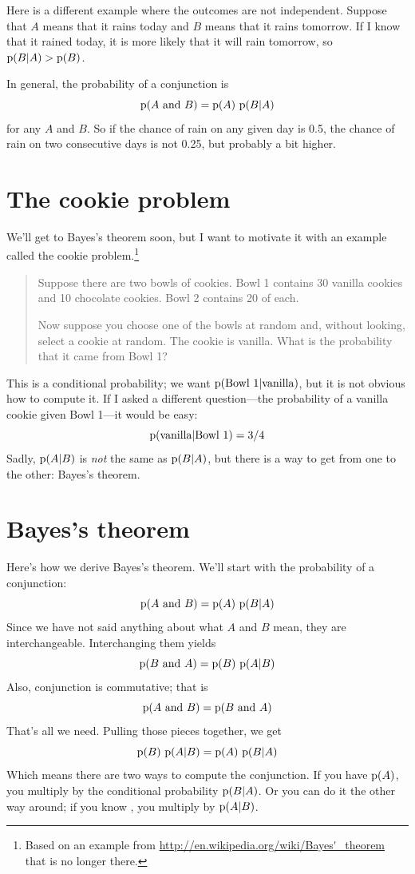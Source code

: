 \documentclass[12pt]{book}
\theoremstyle{exercise}
\begin{document}
Here is a different example where the outcomes are not independent.
Suppose that $A$ means that it rains today and $B$ means that it
rains tomorrow.  If I know that it rained today, it is more likely
that it will rain tomorrow, so $\mathrm{p}(B|A) > \mathrm{p}(B)$.

In general, the probability of a conjunction is
%
\[ \mathrm{p}(A ~\mathrm{and}~ B) = \mathrm{p}(A)~\mathrm{p}(B|A) \]
%
for any $A$ and $B$.  So if the chance of rain on any given day
is 0.5, the chance of rain on two consecutive days is not
0.25, but probably a bit higher.


\section{The cookie problem}
\label{cookie}


We'll get to Bayes's theorem soon, but I want to motivate it with an
example called the cookie problem.\footnote{Based on an example from
  \url{http://en.wikipedia.org/wiki/Bayes'_theorem} that is no longer
  there.}

\begin{quote}
Suppose there are two bowls of cookies.
Bowl 1 contains 30 vanilla cookies and 10 chocolate cookies.
Bowl 2 contains 20 of each.

Now suppose you choose one of the bowls at random and, without
looking, select a cookie at random.
The cookie is vanilla.
What is the probability that it came from Bowl 1?
\end{quote}

This is a conditional probability; we want $\mathrm{p}(\mbox{Bowl 1} |
  \mbox{vanilla})$, but it is not obvious how to compute it.  If I asked a
different question---the probability of a vanilla cookie given Bowl
1---it would be easy:
%
\[ \mathrm{p}(\mbox{vanilla} | \mbox{Bowl 1}) = 3/4 \]
%
Sadly, $\mathrm{p}(A|B)$ is {\em not} the same as $\mathrm{p}(B|A)$, but there
is a way to get from one to the other: Bayes's theorem.


\section{Bayes's theorem}


Here's how we derive Bayes's theorem.
We'll start with the probability of a conjunction:
%
\[ \mathrm{p}(A ~\mathrm{and}~ B) = \mathrm{p}(A)~\mathrm{p}(B|A) \]
%
Since we have not said anything about what $A$ and $B$ mean, they
are interchangeable.
Interchanging them yields
%
\[ \mathrm{p}(B ~\mathrm{and}~ A) = \mathrm{p}(B)~\mathrm{p}(A|B) \]
%
Also, conjunction is commutative; that is
%
\[ \mathrm{p}(A ~\mathrm{and}~ B) = \mathrm{p}(B ~\mathrm{and}~ A) \]
%
That's all we need.  Pulling those pieces together, we get
%
\[ \mathrm{p}(B)~\mathrm{p}(A|B) = \mathrm{p}(A)~\mathrm{p}(B|A) \]
%
Which means there are two ways to compute the conjunction.
If you have $\mathrm{p}(A)$, you multiply by the conditional
probability $\mathrm{p}(B|A)$.
Or you can do it the other way around; if you
know , you multiply by $\mathrm{p}(A|B)$.
\end{document}
